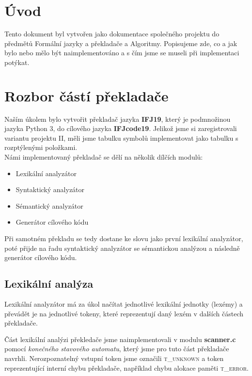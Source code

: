 \documentclass[12pt]{article}
\begin{document}
\tableofcontents
\newpage
\section{Úvod}
Tento dokument byl vytvořen jako dokumentace společného projektu do předmětů Formální jazyky a pře\-kla\-da\-če a Algoritmy. Popisujeme zde, co a jak bylo nebo mělo být naimplementováno a s čím jsme se museli při implementaci potýkat.
\section{Rozbor částí překladače}
Naším úkolem bylo vytvořit překladač jazyka \textbf{IFJ19}, který je podmnožinou jazyka Python 3, do cílového jazyka \textbf{IFJcode19}. Jelikož jsme si zaregistrovali variantu projektu II, měli jsme tabulku symbolů implementovat jako tabulku s rozptýlenými položkami.
\\
Námi implementovaný překladač se dělí na několik dílčích modulů:
\begin{itemize}
  \item Lexikální analyzátor
  \item Syntaktický analyzátor
  \item Sémantický analyzátor
  \item Generátor cílového kódu
\end{itemize}
Při samotném překladu se tedy dostane ke slovu jako první lexikální analyzátor, poté přijde na řadu syntaktický analyzátor se sémantickou analýzou a následně generátor cílového kódu. 
\subsection{Lexikální analýza}
Lexikální analyzátor má za úkol načítat jednotlivé lexikální jednotky (lexémy) a převádět je na jednotlivé tokeny, které reprezentují daný lexém v dalších částech překladače. 

Část lexikální analýzi překledače jsme naimplementovali v modulu \textbf{scanner.c} pomocí \textit{konečného stavového automatu}, který jsme pro tuto část překladače navrhli. Nerozpoznatelný vstupní token jsme označili \textsc{t\_unknown} a token reprezentující interní chybu překladače, například chybu alokace paměti \textsc{t\_error}.
\end{document}
